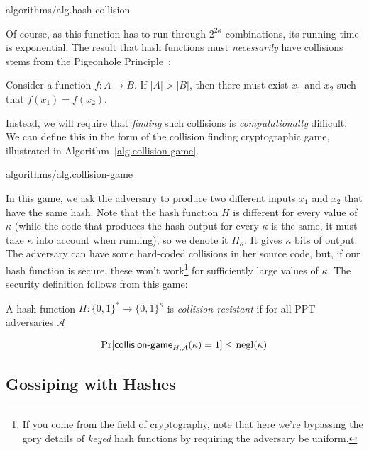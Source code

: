 {algorithms/alg.hash-collision}

Of course, as this function has to run through
$2^{2\kappa}$ combinations, its running time is exponential. The result that hash
functions must \emph{necessarily} have collisions stems from the Pigeonhole
Principle~\cite{liu}:

\begin{theorem}[Pigeonhole]
  Consider a function $f: A \longrightarrow B$. If $|A| > |B|$, then there must
  exist $x_1$ and $x_2$ such that $f(x_1) = f(x_2)$.
\end{theorem}

Instead, we will require that \emph{finding} such collisions is \emph{computationally}
difficult. We can define this in the form of the collision finding cryptographic game,
illustrated in Algorithm~\ref{alg.collision-game}.

{algorithms/alg.collision-game}

In this game, we ask the adversary to produce two different inputs $x_1$ and $x_2$
that have the same hash. Note that the hash function $H$ is different
for every value of $\kappa$ (while the code that produces the hash output for every
$\kappa$ is the same, it must take $\kappa$ into account when running), so we
denote it $H_\kappa$. It gives $\kappa$ bits of output. The adversary can have some
hard-coded collisions in her source code, but, if our hash function is secure, these won't
work\footnote{If you come from the field of cryptography,
note that here we're bypassing the gory details of \emph{keyed} hash functions
by requiring the adversary be uniform.}
for sufficiently large values of $\kappa$. The security definition follows from this game:

\begin{definition}
  A hash function $H: \{0, 1\}^* \longrightarrow \{0, 1\}^\kappa$ is \emph{collision resistant}
  if for all PPT adversaries $\mathcal{A}$

  \[
    \Pr[\textsf{collision-game}_{H,\mathcal{A}}(\kappa) = 1] \leq \mathrm{negl}(\kappa)
  \]
\end{definition}

\subsection*{Gossiping with Hashes}

